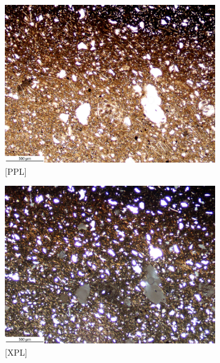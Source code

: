\documentclass[a4paper]{article}
\begin{document}
\begin{figure}[H]
	\centering
	\begin{subfigure}[t]{.49\textwidth}
		\includegraphics[width=\textwidth]{ThinSections/98-1_4x_PPL.jpg}
		\caption{[PPL]}
	\end{subfigure}\hspace{.5em}\hfill
	\begin{subfigure}[t]{.49\textwidth}
		\includegraphics[width=\textwidth]{ThinSections/98-1_4x_XPL.jpg}
		\caption{[XPL]}
	\end{subfigure}
	\begin{subfigure}[t]{.32\textwidth}

\end{subfigure}
\end{figure}
\end{document}
